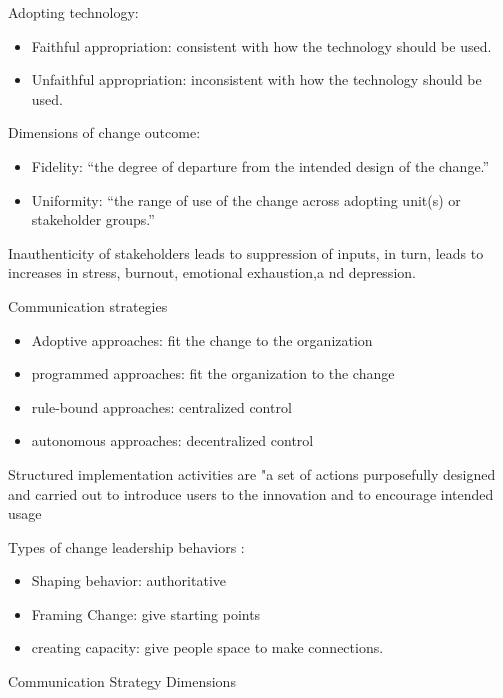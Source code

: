 \documentclass[
]{book}
\providecommand{\tightlist}{%
  \setlength{\itemsep}{0pt}\setlength{\parskip}{0pt}}
\begin{document}
Adopting technology:

\begin{itemize}
\tightlist
\item
  Faithful appropriation: consistent with how the technology should be used.
\item
  Unfaithful appropriation: inconsistent with how the technology should be used.
\end{itemize}

Dimensions of change outcome:

\begin{itemize}
\tightlist
\item
  Fidelity: ``the degree of departure from the intended design of the change.''
\item
  Uniformity: ``the range of use of the change across adopting unit(s) or stakeholder groups.''
\end{itemize}

Inauthenticity of stakeholders leads to suppression of inputs, in turn, leads to increases in stress, burnout, emotional
exhaustion,a nd depression. \citep[pp.~142]{Lewis_2019}

Communication strategies

\begin{itemize}
\tightlist
\item
  Adoptive approaches: fit the change to the organization
\item
  programmed approaches: fit the organization to the change
\item
  rule-bound approaches: centralized control
\item
  autonomous approaches: decentralized control
\end{itemize}

Structured implementation activities are "a set of actions purposefully designed and carried out to introduce users to
the innovation and to encourage intended usage \citep{lewis1993}

Types of change \citep{higgs2005} leadership behaviors :

\begin{itemize}
\tightlist
\item
  Shaping behavior: authoritative
\item
  Framing Change: give starting points
\item
  creating capacity: give people space to make connections.
\end{itemize}

Communication Strategy Dimensions
\end{document}

